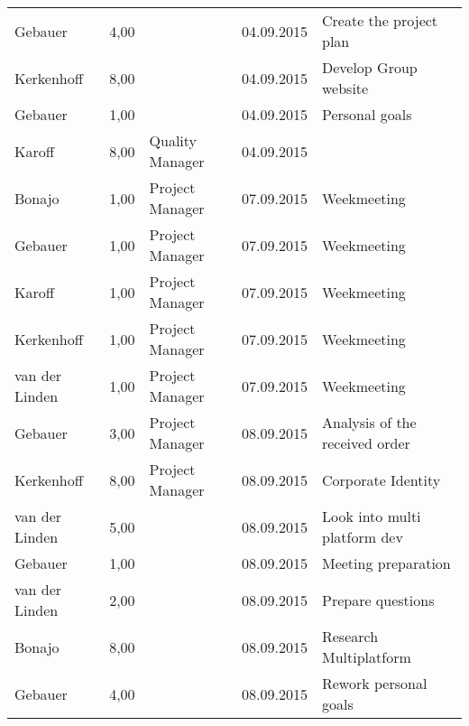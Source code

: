 \begin{longtable}{ l r p{2cm} c p{4cm} }
		Gebauer                 & 4,00           &                 & 04.09.2015    & Create the project plan                      \\
		Kerkenhoff              & 8,00           &                 & 04.09.2015    & Develop Group website                         \\
		Gebauer                 & 1,00           &                 & 04.09.2015    & Personal goals                               \\
		Karoff                  & 8,00           & Quality Manager & 04.09.2015    &                                              \\
		Bonajo                  & 1,00           & Project Manager & 07.09.2015    & Weekmeeting                                  \\
		Gebauer                 & 1,00           & Project Manager & 07.09.2015    & Weekmeeting                                  \\
		Karoff                  & 1,00           & Project Manager & 07.09.2015    & Weekmeeting                                  \\
		Kerkenhoff              & 1,00           & Project Manager & 07.09.2015    & Weekmeeting                                  \\
		van der Linden          & 1,00           & Project Manager & 07.09.2015    & Weekmeeting                                  \\
		Gebauer                 & 3,00           & Project Manager & 08.09.2015    & Analysis of the received order               \\
		Kerkenhoff              & 8,00           & Project Manager & 08.09.2015    & Corporate Identity                           \\
		van der Linden          & 5,00           &                 & 08.09.2015    & Look into multi platform dev                 \\
		Gebauer                 & 1,00           &                 & 08.09.2015    & Meeting preparation                          \\
		van der Linden          & 2,00           &                 & 08.09.2015    & Prepare questions                            \\
		Bonajo                  & 8,00           &                 & 08.09.2015    & Research Multiplatform                       \\
		Gebauer                 & 4,00           &                 & 08.09.2015    & Rework personal goals                        \\

\end{longtable}

